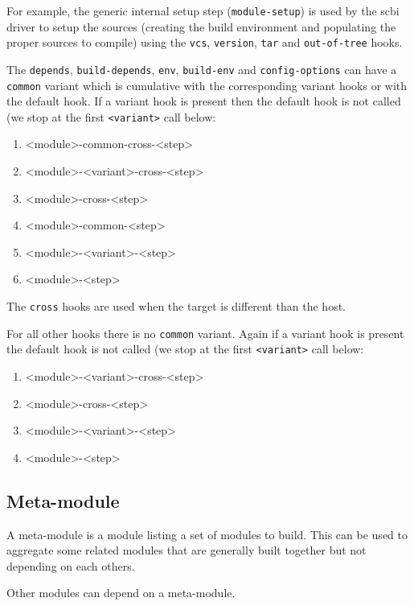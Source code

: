 \documentclass[a4paper,12pt,twoside]{article}
\newcommand{\code}[1]{\texttt{#1}}
\begin{document}
For example, the generic internal setup step (\code{module-setup}) is used by the scbi driver to setup the sources (creating the build environment and populating the proper sources to compile) using the \code{vcs}, \code{version}, \code{tar} and \code{out-of-tree} hooks.

The \code{depends}, \code{build-depends}, \code{env}, \code{build-env} and \code{config-options} can have a \code{common} variant which is cumulative with the corresponding variant hooks or with the default hook. If a variant hook is present then the default hook is not called (we stop at the first \code{<variant>} call below:

\begin{enumerate}
	\item <module>-common-cross-<step>
	\item <module>-<variant>-cross-<step>
	\item <module>-cross-<step>
	\item <module>-common-<step>
	\item <module>-<variant>-<step>
	\item <module>-<step>
\end{enumerate}

The \code{cross} hooks are used when the target is different than the host.

For all other hooks there is no \code{common} variant. Again if a variant hook is present the default hook is not called (we stop at the first \code{<variant>} call below:

\begin{enumerate}
	\item <module>-<variant>-cross-<step>
	\item <module>-cross-<step>
	\item <module>-<variant>-<step>
	\item <module>-<step>
\end{enumerate}

\subsection{Meta-module}
\label{meta-module}

A meta-module is a module listing a set of modules to build. This can be used to aggregate some related modules that are generally built together but not depending on each others.

Other modules can depend on a meta-module.
\end{document}
